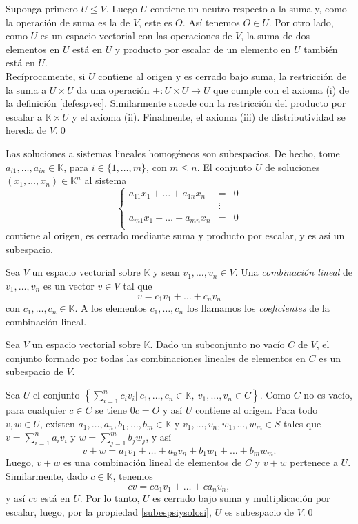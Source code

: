 \dem Suponga primero $U\le V$. Luego $U$ contiene un neutro respecto a la suma y, como la operaci\'on de suma es la de $V$, este es $O$. As\'i tenemos $O\in U$. Por otro lado, como $U$ es un espacio vectorial con las operaciones de $V$, la suma de dos elementos en $U$ est\'a en $U$ y producto por escalar de un elemento en $U$ tambi\'en est\'a en $U$.\\
Rec\'iprocamente, si $U$ contiene al origen y es cerrado bajo suma, la restricci\'on de la suma a $U\times U$ da una operaci\'on $+:U\times U\rightarrow U$ que cumple con el axioma (i) de la definici\'on \ref{defespvec}. Similarmente sucede con la restricci\'on del producto por escalar a $\mathbb{K}\times U$ y el axioma (ii). Finalmente, el axioma (iii) de distributividad se hereda de $V$.\qed

\begin{ejem}
Las soluciones a sistemas lineales homogéneos son subespacios. De hecho, tome $a_{i1},\ldots,a_{in}\in \mathbb{K}$, para $i\in\{1,\ldots,m\}$, con $m\le n$. El conjunto $U$ de soluciones $(x_1,\ldots,x_n)\in\mathbb{K}^n$ al sistema
$$\left\{
\begin{array}{lcr}
  a_{11}x_1+\ldots+a_{1n}x_n & = & 0\\
   & \vdots & \\
  a_{m1}x_1+\ldots+a_{mn}x_n & = & 0\\
\end{array}
\right.$$
contiene al origen, es cerrado mediante suma y producto por escalar, y es así un subespacio.
\end{ejem}

\begin{defn}
Sea $V$ un espacio vectorial sobre $\mathbb{K}$ y sean $v_1,\ldots,v_n\in V$. Una \emph{combinaci\'on lineal} de  $v_1,\ldots,v_n$ es un vector $v\in V$ tal que
\[
v=c_1v_1+\ldots+c_nv_n
\]
con $c_1,\ldots,c_n\in\mathbb{K}$. A los elementos $c_1,\ldots,c_n$ los llamamos los \emph{coeficientes} de la combinaci\'on lineal.
\end{defn}

\begin{prop}
Sea $V$ un espacio vectorial sobre $\mathbb{K}$. Dado un subconjunto no vac\'io $C$ de $V$, el conjunto formado por todas las combinaciones lineales de elementos en $C$ es un subespacio de $V$.
\end{prop}

\dem Sea $U$ el conjunto $\left\{\sum_{i=1}^nc_iv_i\Big|\ c_1,\ldots,c_n\in \mathbb{K},\ v_1,\ldots,v_n\in C \right\}$. Como $C$ no es vacío, para cualquier $c\in C$ se tiene $0c=O$ y así $U$ contiene al origen.
Para todo $v,w\in U$, existen $a_1,\ldots,a_n,b_1,\ldots,b_m\in \mathbb{K}$ y $v_1,\ldots,v_n,w_1,\ldots,w_m\in S$ tales que $v=\sum_{i=1}^n a_iv_i$ y $w=\sum_{j=1}^m b_jw_j$, y así
\[
v+w=a_1v_1+\ldots+a_nv_n+b_1w_1+\ldots+b_mw_m.
\]
Luego, $v+w$ es una combinaci\'on lineal de elementos de $C$ y $v+w$ pertenece a $U$. Similarmente, dado $c\in \mathbb{K}$, tenemos
\[
cv=ca_1v_1+\ldots+ca_nv_n,
\]
y as\'i $cv$ est\'a en $U$. Por lo tanto, $U$ es cerrado bajo suma y multiplicaci\'on por escalar, luego, por la propiedad \ref{subespsiysolosi}, $U$ es subespacio de $V$.\qed

